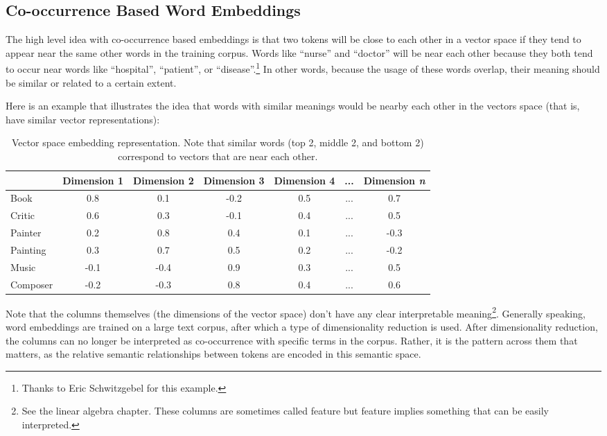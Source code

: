 \subsection{Co-occurrence Based Word Embeddings}


The high level idea with co-occurrence based embeddings is that two tokens will be close to each other in a vector space if they tend to appear near the same other words in the training corpus. Words like ``nurse'' and ``doctor'' will be near each other because they both tend to occur near words like ``hospital'', ``patient'', or ``disease''.\footnote{Thanks to Eric Schwitzgebel for this example.} In other words, because the usage of these words overlap, their meaning should be similar or related to a certain extent. 

Here is an example that illustrates the idea that words with similar meanings would be nearby each other in the vectors space (that is, have similar vector representations):
\begin{table}[h]
    \centering
    \begin{tabular}{|l|c|c|c|c|c|c|}
    \hline
     & Dimension 1 & Dimension 2 & Dimension 3 & Dimension 4 & ... & Dimension \textit{n} \\
    \hline
    Book    & 0.8 & 0.1 & -0.2 & 0.5 & ... & 0.7  \\
    \hline
    Critic  & 0.6 & 0.3 & -0.1 & 0.4 & ... & 0.5  \\
    \hline
    Painter & 0.2 & 0.8 & 0.4 & 0.1 & ... & -0.3 \\
    \hline
    Painting& 0.3 & 0.7 & 0.5 & 0.2 & ... & -0.2  \\
    \hline
    Music   & -0.1 & -0.4 & 0.9 & 0.3 & ... & 0.5  \\
    \hline
    Composer& -0.2 & -0.3 & 0.8 & 0.4 & ... & 0.6 \\
    \hline
    \end{tabular}
    \caption{Vector space embedding representation. Note that similar words (top 2, middle 2, and bottom 2) correspond to vectors that are near each other.}
    \label{exampleEmbeddings}
\end{table}

Note that the columns themselves (the dimensions of the vector space) don't have any clear interpretable meaning\footnote{See the linear algebra chapter. These columns are sometimes called feature but feature implies something that can be easily interpreted.}. Generally speaking, word embeddings are trained on a large text corpus, after which a type of dimensionality reduction is used. After dimensionality reduction, the columns can no longer be interpreted as co-occurrence with specific terms in the corpus. Rather, it is the pattern across them that matters, as the relative semantic relationships between tokens are encoded in this semantic space. 

